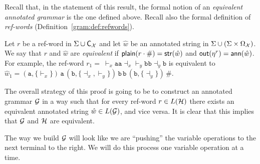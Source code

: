 Recall that, in the statement of this result, the formal notion of an
\emph{equivalent annotated grammar} is the one defined above.
Recall also the formal definition of
\emph{ref-words} (Definition~\ref{gram:def:refwords}).

%
%
%
%
%
%

Let $r$ be a ref-word in $\Sigma \cup \textsf{C}_{\mathcal{X}}$ and let $\hat{w}$ be an annotated string in $\Sigma \cup (\Sigma \times \Omega_{\mathcal{X}})$. We say that $r$ and $\hat{w}$ are \emph{equivalent} if $\textsf{plain}(r\cdot\#) = \mathsf{str}(\hat{w})$ and $\textsf{out}(\eta^{r}) = \textsf{ann}(\hat{w})$. 
For example, the ref-word $r_1 = \ \vdash_x\!\texttt{a}\texttt{a}\!\dashv_x\vdash_y\!\texttt{b}\texttt{b}\!\dashv_y\!\texttt{b}$ is equivalent to $\hat{w}_1 = (\texttt{a},\{\vdash_x\})\,\texttt{a}\,(\texttt{b},\{\dashv_x,\vdash_y\})\,\texttt{b}\,\texttt{b}\,(\texttt{b},\{\dashv_y\})\,\#$.

The overall strategy of this proof is going to be to construct an annotated grammar $\mathcal{G}$ in a way such that for every ref-word $r\in L(\mathcal{H})$ there exists an equivalent annotated string $\hat{w}\in L(\mathcal{G})$, and vice versa. It is clear that this implies that $\mathcal{G}$ and $\mathcal{H}$ are equivalent.

The way we build $\mathcal{G}$ will look like we are ``pushing'' the variable operations to the next terminal to the right. 
We will do this process one variable operation at a time.

